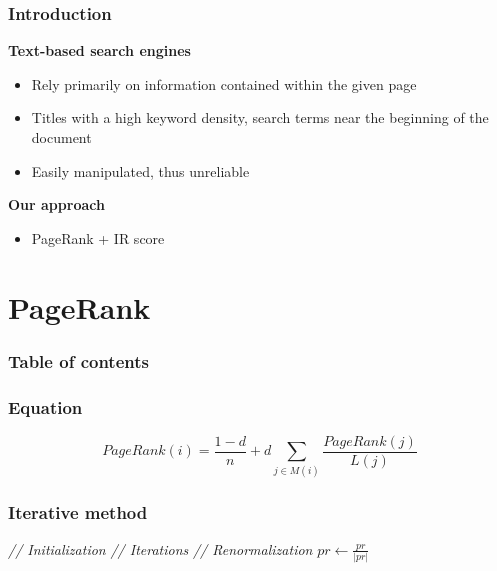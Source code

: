 \documentclass[10pt]{beamer}
\begin{document}
\begin{frame}
  \frametitle{Introduction}
  \textbf{Text-based search engines}
  \begin{itemize}
    \item Rely primarily on information contained within the given page
    \item Titles with a high keyword density, search terms near the beginning of the document
    \item Easily manipulated, thus unreliable
  \end{itemize}
  \textbf{Our approach}
  \begin{itemize}
    \item PageRank + IR score
  \end{itemize}
\end{frame}



\section{PageRank}

\begin{frame}
  \frametitle{Table of contents}
  \tableofcontents[currentsection]
\end{frame}

\begin{frame}
  \frametitle{Equation}
  $$ PageRank \left( i \right) = \frac{1 - d}{n} + d \sum\limits_{j \in M \left( i \right)} \frac{PageRank \left( j \right)}{L \left( j \right)} $$
\end{frame}

\begin{frame}
  \frametitle{Iterative method}
\IncMargin{1em}
\begin{algorithm}[H]
\BlankLine
\Indm
{}
\Indp
\BlankLine
\emph{// Initialization}\;
\emph{// Iterations}\;
\emph{// Renormalization}\;
$pr\leftarrow\frac{pr}{|pr|}$\;
\BlankLine
\end{algorithm}
\DecMargin{1em}
\end{frame}
\end{document}
